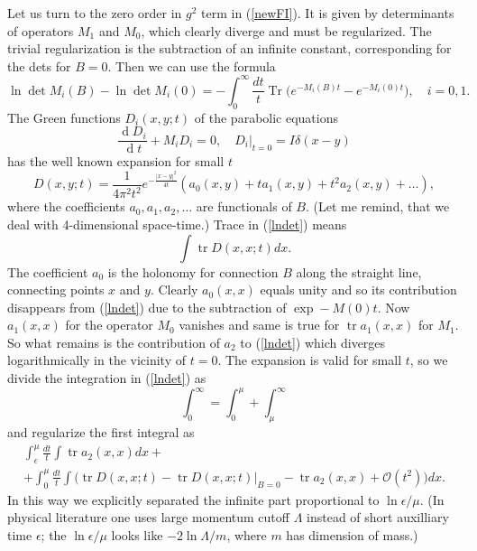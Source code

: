\documentclass[12pt]{article}
\DeclareMathOperator{\tr}{tr}
\DeclareMathOperator{\Tr}{Tr}
\DeclareMathOperator{\dd}{d}
\begin{document}
	Let us turn to the zero order in 
    $ g^{2} $
	term in
(\ref{newFI}).
	It is given by determinants of operators
    $ M_{1} $ and
    $ M_{0} $,
	which clearly diverge and must be regularized.
	The trivial regularization is the subtraction of an infinite
	constant, corresponding for the dets for
    $ B=0 $.
	Then we can use the formula
\begin{equation}
\label{lndet}
    \ln \det M_{i} (B) - \ln \det M_{i}(0) = - \int_{0}^{\infty}
	\frac{dt}{t} \Tr \bigl(e^{-M_{i}(B)t} - e^{-M_{i}(0)t}\bigr) ,
	\quad i=0,1 .
\end{equation}
	The Green functions
    $ D_{i}(x,y;t) $
	of the parabolic equations
\begin{equation}
    \frac{\dd D_{i}}{\dd t} + M_{i} D_{i} = 0, \quad
	D_{i} |_{t=0} = I \delta(x-y)
\end{equation}
	has the well known expansion for small
    $ t $
\begin{equation*}
    D(x,y;t) = \frac{1}{4\pi^{2}t^{2}} e^{- \frac{|x-y|^{2}}{4t}}
	(a_{0}(x,y) + t a_{1}(x,y) +t^{2} a_{2}(x,y) + \ldots) ,
\end{equation*}
	where the coefficients
    $ a_{0}, a_{1}, a_{2}, \ldots $
	are functionals of 
    $ B $.
	(Let me remind, that we deal with 4-dimensional space-time.)
	Trace in
(\ref{lndet})
	means
\begin{equation}
\label{Tr}
    \int \tr D(x,x;t) dx .
\end{equation}
	The coefficient
    $ a_{0} $
	is the holonomy for connection
    $ B $
	along the straight line, connecting points
    $ x $
	and
    $ y $.
	Clearly
    $ a_{0}(x,x) $
	equals unity and so its contribution disappears from
(\ref{lndet})
	due to the subtraction of 
    $ \exp - M(0) t $.
	Now
    $ a_{1}(x,x) $
	for the operator
    $ M_{0} $
	vanishes and same is true for
    $ \tr a_{1}(x,x) $
	for
    $ M_{1} $.
	So what remains is the contribution of 
    $ a_{2} $
	to
(\ref{lndet})
	which diverges logarithmically in the vicinity of 
    $ t=0 $.
	The expansion is valid for small 
    $ t $, 
	so we divide the integration in
(\ref{lndet}) as
\begin{equation}
    \int_{0}^{\infty} = \int_{0}^{\mu} + \int_{\mu}^{\infty}
\end{equation}
	and regularize the first integral as
\begin{multline*}
    \int_{\epsilon}^{\mu} \frac{dt}{t} \int \tr a_{2}(x,x) dx + \\
	+ \int_{0}^{\mu} \frac{dt}{t} \int \bigl(\tr D(x,x;t)
	    - \tr D(x,x;t)|_{B=0} - \tr a_{2}(x,x) 
	      + \mathcal{O}(t^{2})\bigr) dx .
\end{multline*}
	In this way we explicitly separated the infinite part
	proportional to
    $ \ln \epsilon /\mu $.
(In physical literature one uses large momentum cutoff
    $ \Lambda $
instead of short auxilliary time
    $ \epsilon $;
the
    $ \ln \epsilon/\mu $
looks like
    $ -2 \ln \Lambda/m $,
where
    $ m $
has dimension of mass.)
\end{document}
